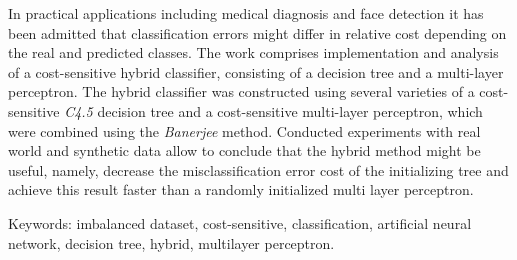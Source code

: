 
In practical applications including medical diagnosis and face detection it has been admitted that classification errors might differ in relative cost depending on the real and predicted classes. The work comprises implementation and analysis of a cost-sensitive hybrid classifier, consisting of a decision tree and a multi-layer perceptron. The hybrid classifier was constructed using several varieties of a cost-sensitive \emph{C4.5} decision tree and a cost-sensitive multi-layer perceptron, which were combined using the \emph{Banerjee} method. Conducted experiments with real world and synthetic data allow to conclude that the hybrid method might be useful, namely, decrease the misclassification error cost of the initializing tree and achieve this result faster than a randomly initialized multi layer perceptron.

\bigskip
Keywords: imbalanced dataset, cost-sensitive, classification, artificial neural network, decision tree, hybrid, multilayer perceptron.
